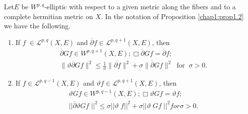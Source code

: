 \begin{prop}\label{chap1:prop1.3}%
  Let\pageoriginale $E$ be $W^{p,q}$-elliptic with respect to a given
  metric along the fibers and to a complete hermitian metric 
  on $X$. In the notation of Proposition \ref{chap1:prop1.2} we have
  the following. 
  \begin{enumerate}[\rm (i)]
  \item If $f \; \in \mathcal{L}^{p,q} (X,E)$ and 
    $\overline{\partial}f\in \mathcal{L}^{p,{q+1}} (X,E)$, then 
    \begin{multline*}
      \overline {\partial}{Gf}\in W^{p,{q+1}}  (X,E); \Box
      \overline{\partial} {Gf} = \overline{\partial}f;\\
      \| \vartheta \overline{\partial} {Gf} \|^{2} \leqslant
      \frac{1}{\sigma}  \| \overline{\partial f} \|^{2} +
      \sigma \| \overline{\partial}{Gf} \|^{2} ~\text{ for }~
      \sigma > 0.
    \end{multline*}

  \item If $f\in \mathcal{L}^{p,q-1}(X,E)$ and
  $\vartheta f \in \mathcal{L}^{p,q+1} (X,E)$, then  
    \begin{multline*}
      \vartheta Gf \in W^{p,{q-1}} (X,E); \Box \vartheta Gf = \vartheta f;\\
      || \bar{\partial }\vartheta Gf\; ||^2 \leqslant \sigma ||
      \vartheta \; f ||^2 + \sigma || \vartheta \; Gf\; ||^2
      for \sigma > 0.
    \end{multline*}
  \end{enumerate}
\end{prop}

